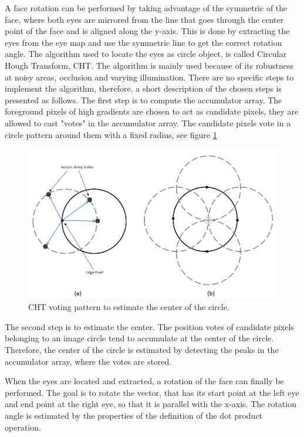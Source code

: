 A face rotation can be performed by taking advantage of the symmetric of the face, where both eyes are mirrored from the line that goes through the center point of the face and is aligned along the y-axis. This is done by extracting the eyes from the eye map and use the symmetric line to get the correct rotation angle.
\newline
The algorithm used to locate the eyes as circle object, is called Circular Hough Transform, CHT. The algorithm is mainly used because of its robustness at noisy areas, occlusion and varying illumination. There are no specific steps to implement the algorithm, therefore, a short description of the chosen steps is presented as follows.
\newline
\newline
The first step is to compute the accumulator array. The foreground pixels of high gradients are chosen to act as candidate pixels, they are allowed to cast "votes" in the accumulator array. The candidate pixels vote in a circle pattern around them with a fixed radius, see figure \ref{fig:CHT}
\newline
\begin{figure}[H]
\centering

\includegraphics[scale=0.4]{img/fd/accarray.png}

\caption{CHT voting pattern to estimate the center of the circle.}
\label{fig:CHT}
\end{figure}
\indent 
The second step is to estimate the center. The position votes of candidate pixels belonging to an image circle tend to accumulate at the center of the circle. Therefore, the center of the circle is estimated by detecting the peaks in the accumulator array, where the votes are stored.

When the eyes are located and extracted, a rotation of the face can finally be performed.  The goal is to rotate the vector, that has its start point at the left eye and end point at the right eye, so that it is parallel with the x-axis. The rotation angle is estimated by the properties of the definition of the dot product operation.
